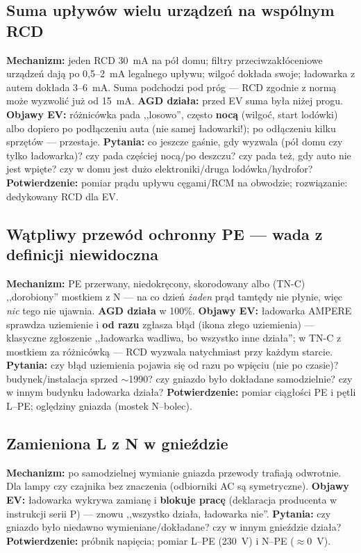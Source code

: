 \documentclass[11pt,a4paper]{article}
\begin{document}
\subsection{Suma upływów wielu urządzeń na wspólnym RCD}
\textbf{Mechanizm:} jeden RCD 30~mA na pół domu; filtry przeciwzakłóceniowe urządzeń dają po
0,5--2~mA legalnego upływu; wilgoć dokłada swoje; ładowarka z autem dokłada 3--6~mA. Suma podchodzi
pod próg --- RCD zgodnie z normą może wyzwolić już od 15~mA. \textbf{AGD działa:} przed EV suma
była niżej progu. \textbf{Objawy EV:} różnicówka pada ,,losowo'', często \textbf{nocą} (wilgoć,
start lodówki) albo dopiero po podłączeniu auta (nie samej ładowarki!); po odłączeniu kilku
sprzętów --- przestaje. \textbf{Pytania:} co jeszcze gaśnie, gdy wyzwala (pół domu czy tylko
ładowarka)? czy pada częściej nocą/po deszczu? czy pada też, gdy auto nie jest wpięte? czy w domu
jest dużo elektroniki/druga lodówka/hydrofor? \textbf{Potwierdzenie:} pomiar prądu upływu
cęgami/RCM na obwodzie; rozwiązanie: dedykowany RCD dla EV.

\subsection{Wątpliwy przewód ochronny PE --- wada z definicji niewidoczna}
\textbf{Mechanizm:} PE przerwany, niedokręcony, skorodowany albo (TN-C) ,,dorobiony'' mostkiem
z N --- na co dzień \emph{żaden} prąd tamtędy nie płynie, więc \emph{nic} tego nie ujawnia.
\textbf{AGD działa} w 100\%. \textbf{Objawy EV:} ładowarka AMPERE sprawdza uziemienie i \textbf{od
razu} zgłasza błąd (ikona złego uziemienia) --- klasyczne zgłoszenie ,,ładowarka wadliwa, bo
wszystko inne działa''; w TN-C z mostkiem za różnicówką --- RCD wyzwala natychmiast przy każdym
starcie. \textbf{Pytania:} czy błąd uziemienia pojawia się od razu po wpięciu (nie po czasie)?
budynek/instalacja sprzed $\sim$1990? czy gniazdo było dokładane samodzielnie? czy w innym budynku
ładowarka działa? \textbf{Potwierdzenie:} pomiar ciągłości PE i pętli L--PE; oględziny gniazda
(mostek N--bolec).

\subsection{Zamieniona L z N w gnieździe}
\textbf{Mechanizm:} po samodzielnej wymianie gniazda przewody trafiają odwrotnie. Dla lampy czy
czajnika bez znaczenia (odbiorniki AC są symetryczne). \textbf{Objawy EV:} ładowarka wykrywa
zamianę i \textbf{blokuje pracę} (deklaracja producenta w instrukcji serii P) --- znowu ,,wszystko
działa, ładowarka nie''. \textbf{Pytania:} czy gniazdo było niedawno wymieniane/dokładane? czy
w innym gnieździe działa? \textbf{Potwierdzenie:} próbnik napięcia; pomiar L--PE (230~V)
i N--PE ($\approx$0~V).
\end{document}
